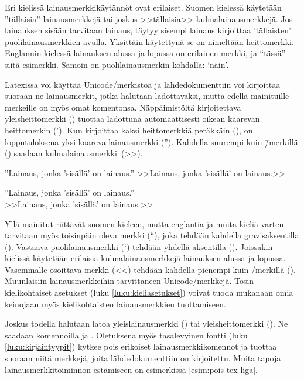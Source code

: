 Eri kielissä lainausmerkkikäytännöt ovat erilaiset. Suomen kielessä
käytetään ''tällaisia'' lainausmerkkejä tai joskus >>tällaisia>>
kulmalainausmerkkejä. Jos lainauksen sisään tarvitaan lainaus, täytyy
sisempi lainaus kirjoittaa 'tällaisten' puolilainausmerkkien avulla.
Yksittäin käytettynä se on nimeltään heittomerkki. Englannin kielessä
lainauksen alussa ja lopussa on erilainen merkki, ja ``tässä'' siitä
esimerkki. Samoin on puolilainausmerkin kohdalla: `näin'.

Latexissa voi käyttää Unicode\-/merkistöä ja lähdedokumenttiin voi
kirjoittaa suoraan ne lainausmerkit, jotka halutaan ladottavaksi, mutta
edellä mainituille merkeille on myös omat komentonsa. Näppäimistöltä
kirjoitettava yleisheittomerkki () tuottaa ladottuna
automaattisesti oikean kaarevan heittomerkin ('). Kun kirjoittaa kaksi
heittomerkkiä peräkkäin (), on lopputuloksena yksi kaareva
lainausmerkki (''). Kahdella suurempi kuin \=/merkillä (\koodi{>>})
saadaan kulmalainausmerkki~(>>).

\pagebreak[3]

\begin{koodilohkosis}
  ''Lainaus, jonka 'sisällä' on lainaus.''
  >>Lainaus, jonka 'sisällä' on lainaus.>>
\end{koodilohkosis}

\begin{tulossis}
  ''Lainaus, jonka 'sisällä' on lainaus.'' \\
  >>Lainaus, jonka 'sisällä' on lainaus.>>
\end{tulossis}

Yllä mainitut riittävät suomen kieleen, mutta englantia ja muita kieliä
varten tarvitaan myös toisinpäin oleva merkki (``), joka tehdään
kahdella gra\-vis\-ak\-sen\-til\-la (). Vastaava
puolilainausmerkki (`) tehdään yhdellä aksentilla (). Joissakin
kielissä käytetään erilaisia kulmalainausmerkkejä lainauksen alussa ja
lopussa. Vasemmalle osoittava merkki (<<) tehdään kahdella pienempi kuin
\=/merkillä (\koodi{<<}). Muunlaisiin lainausmerkkeihin tarvittaneen
Unicode\-/merkkejä. Tosin kielikohtaiset asetukset (luku
\ref{luku:kieliasetukset}) voivat tuoda mukanaan omia keinojaan myös
kielikohtaisten lainausmerkkien tuottamiseen.

Joskus todella halutaan latoa yleislainausmerkki (\textquotedbl) tai
yleisheittomerkki (\textquotesingle). Ne saadaan komennoilla
 ja . Oletuksena
myös tasalevyinen fontti (luku \ref{luku:kirjaintyypit}) kytkee pois
erikoiset lainausmerkkikomennot ja tuottaa suoraan niitä merkkejä, joita
lähdedokumenttiin on kirjoitettu. Muita tapoja lainausmerkkitoiminnon
estämiseen on esimerkissä \ref{esim:pois-tex-liga}.

